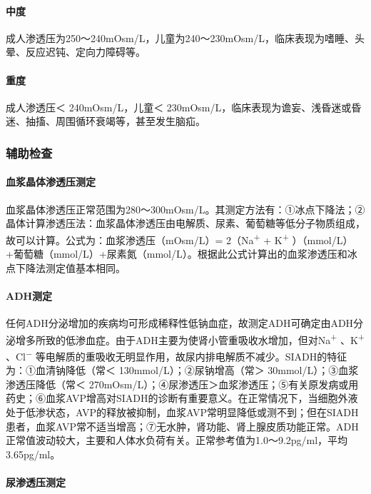 \paragraph{中度}

成人渗透压为250～240mOsm/L，儿童为240～230mOsm/L，临床表现为嗜睡、头晕、反应迟钝、定向力障碍等。

\paragraph{重度}

成人渗透压＜ 240mOsm/L，儿童＜
230mOsm/L，临床表现为谵妄、浅昏迷或昏迷、抽搐、周围循环衰竭等，甚至发生脑疝。

\subsubsection{辅助检查}

\paragraph{血浆晶体渗透压测定}

血浆晶体渗透压正常范围为280～300mOsm/L。其测定方法有：①冰点下降法；②晶体计算渗透压法：血浆晶体渗透压由电解质、尿素、葡萄糖等低分子物质组成，故可以计算。公式为：血浆渗透压（mOsm/L）=
2（Na\textsuperscript{+} + K\textsuperscript{+}
）（mmol/L）+葡萄糖（mmol/L）+尿素氮（mmol/L）。根据此公式计算出的血浆渗透压和冰点下降法测定值基本相同。

\paragraph{ADH测定}

任何ADH分泌增加的疾病均可形成稀释性低钠血症，故测定ADH可确定由ADH分泌增多所致的低渗血症。由于ADH主要为使肾小管重吸收水增加，但对Na\textsuperscript{+}
、K\textsuperscript{+} 、Cl\textsuperscript{−}
等电解质的重吸收无明显作用，故尿内排电解质不减少。SIADH的特征为：①血清钠降低（常＜
130mmol/L）；②尿钠增高（常＞ 30mmol/L）；③血浆渗透压降低（常＜
270mOsm/L）；④尿渗透压＞血浆渗透压；⑤有关原发病或用药史；⑥血浆AVP增高对SIADH的诊断有重要意义。在正常情况下，当细胞外液处于低渗状态，AVP的释放被抑制，血浆AVP常明显降低或测不到；但在SIADH患者，血浆AVP常不适当增高；⑦无水肿，肾功能、肾上腺皮质功能正常。ADH正常值波动较大，主要和人体水负荷有关。正常参考值为1.0～9.2pg/ml，平均3.65pg/ml。

\paragraph{尿渗透压测定}

